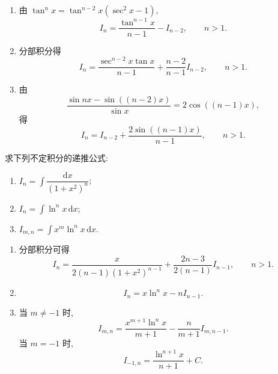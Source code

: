 \begin{solution}
    \leavevmode
    \begin{enumerate}
        \item 由 $\tan^n x=\tan^{n-2}x(\sec^2x-1)$,
              \[
                  I_n=\dfrac{\tan^{n-1}x}{n-1}-I_{n-2},
                  \qquad n>1.
              \]
        \item 分部积分得
              \[
                  I_n=\dfrac{\sec^{n-2}x\tan x}{n-1}
                  +\dfrac{n-2}{n-1}I_{n-2},
                  \qquad n>1.
              \]
        \item 由
              \[
                  \dfrac{\sin nx-\sin((n-2)x)}{\sin x}=2\cos((n-1)x),
              \]
              得
              \[
                  I_n=I_{n-2}+\dfrac{2\sin((n-1)x)}{n-1},
                  \qquad n>1.
              \]
    \end{enumerate}
\end{solution}

\begin{example}
    求下列不定积分的递推公式:
    \begin{enumerate}
        \item $\displaystyle I_n=\int\dfrac{\mathrm{d}x}{(1+x^2)^n}$;
        \item $\displaystyle I_n=\int\ln^n x\,\mathrm{d}x$;
        \item $\displaystyle I_{m,n}=\int x^m\ln^n x\,\mathrm{d}x$.
    \end{enumerate}
\end{example}
\exampleblank

\begin{solution}
    \leavevmode
    \begin{enumerate}
        \item 分部积分可得
              \[
                  I_n=\dfrac{x}{2(n-1)(1+x^2)^{n-1}}
                  +\dfrac{2n-3}{2(n-1)}I_{n-1},
                  \qquad n>1.
              \]
        \item
              \[
                  I_n=x\ln^n x-nI_{n-1}.
              \]
        \item 当 $m\neq-1$ 时,
              \[
                  I_{m,n}=\dfrac{x^{m+1}\ln^n x}{m+1}
                  -\dfrac{n}{m+1}I_{m,n-1}.
              \]
              当 $m=-1$ 时,
              \[
                  I_{-1,n}=\dfrac{\ln^{n+1}x}{n+1}+C.
              \]
    \end{enumerate}
\end{solution}


